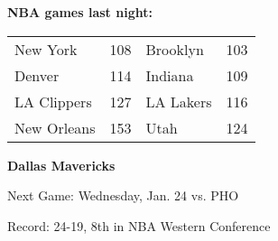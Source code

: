 \textbf{NBA games last night:
}\begin{tabular}{llll}
\toprule
   New York & 108 &  Brooklyn & 103 \\
     Denver & 114 &   Indiana & 109 \\
LA Clippers & 127 & LA Lakers & 116 \\
New Orleans & 153 &      Utah & 124 \\
\bottomrule
\end{tabular}

\textbf{Dallas Mavericks}

Next Game: Wednesday, Jan. 24 vs. PHO

Record: 24-19, 8th in NBA Western Conference
